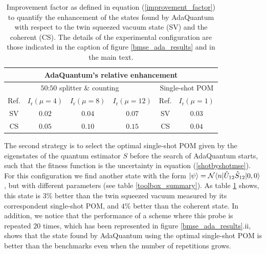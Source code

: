 \begin{table} [t]
\centering
{\renewcommand{\arraystretch}{1.2} 
\begin{tabular}{|c|c|c|c|c|c|}
\hline
\multicolumn{6}{|c|}{AdaQuantum's relative enhancement} \\
\hline
\hline
\multicolumn{4}{|c|}{$50$:$50$ splitter \& counting } & \multicolumn{2}{c|}{Single-shot POM} \\
\hline
Ref. & $I_{\mathrm{r}}(\mu=4)$ & $I_{\mathrm{r}}(\mu=8)$ & $I_{\mathrm{r}}(\mu=12)$ & Ref. & $I_{\mathrm{r}}(\mu=1)$ \\
\hline
SV & $0.02$ & $0.04$ & $0.07$ & SV & $0.03$ \\
CS & $0.05$ & $0.10$ & $0.15$ & CS & $0.04$ \\
\hline
\end{tabular}}
\caption[AdaQuantum's relative enhancement]{Improvement factor as defined in equation (\ref{improvement_factor}) to quantify the enhancement of the states found by AdaQuantum with respect to the twin squeezed vacuum state (SV) and the coherent (CS). The details of the experimental configuration are those indicated in the caption of figure \ref{bmse_ada_results} and in the main text.}
\label{bayesian_ada_improvement}
\end{table}

The second strategy is to select the optimal single-shot POM given by the eigenstates of the quantum estimator $S$ before the search of AdaQuantum starts, such that the fitness function is the uncertainty in equation (\ref{shotbyshotmse}). For this configuration we find another state with the form  $\ket{\psi} = \mathcal{N}\langle n|\hat{U}_{12}\hat{S}_{12}|0,0\rangle$, but with different parameters (see table \ref{toolbox_summary}). As table \ref{bayesian_ada_improvement} shows, this state is $3\%$ better than the twin squeezed vacuum measured by its correspondent single-shot POM, and $4\%$ better than the coherent state. In addition, we notice that the performance of a scheme where this probe is repeated $20$ times, which has been represented in figure \ref{bmse_ada_results}.ii, shows that the state found by AdaQuantum using the optimal single-shot POM is better than the benchmarks even when the number of repetitions grows. 

